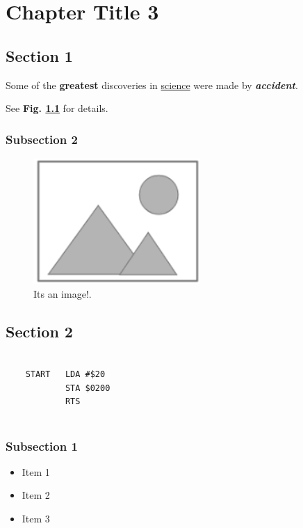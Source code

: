 \chapter{Chapter Title 3}

\section{Section 1}

Some of the \textbf{greatest} 
discoveries in \underline{science} 
were made by \textbf{\textit{accident}}.

See \textbf{Fig. \ref{fig:uniquename}} for details.

\subsection{Subsection 2}

\begin{figure}[htbp]
\begin{center}
\includegraphics[width=2.5in]{images/image.png}
\caption{Its an image!.}
\label{fig:uniquename}
\end{center}
\end{figure}

\section{Section 2}

\begin{verbatim}

    START   LDA #$20
            STA $0200    
            RTS
            
\end{verbatim}

\subsection{Subsection 1}

\begin{itemize}
\item Item 1
\item Item 2
\item Item 3
\end{itemize}